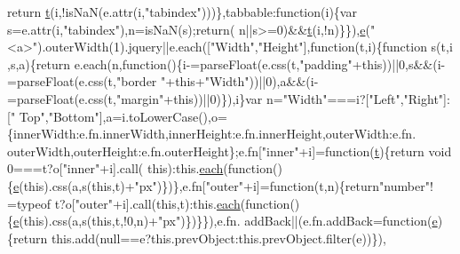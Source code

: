 \begin{DoxyCode}
{      return} \hyperlink{jquery-2_80_83_8min_8js_aaccc9105df5383111407fd5b41255e23}{t}(i,!isNaN(e.attr(i,\textcolor{stringliteral}{"tabindex"})))\},tabbable:\textcolor{keyword}{function}(i)\{var s=e.attr(i,\textcolor{stringliteral}{"tabindex"}),n=isNaN(s);\textcolor{keywordflow}{return}(
      n||s>=0)&&\hyperlink{jquery-2_80_83_8min_8js_aaccc9105df5383111407fd5b41255e23}{t}(i,!n)\}\}),\hyperlink{jquery-ui_8min_8js_a2c038346d47955cbe2cb91e338edd7e1}{e}(\textcolor{stringliteral}{"<a>"}).outerWidth(1).jquery||e.each([\textcolor{stringliteral}{"Width"},\textcolor{stringliteral}{"Height"}],\textcolor{keyword}{function}(t,i)\{\textcolor{keyword}{function} s(t,i
      ,s,a)\{\textcolor{keywordflow}{return} e.each(n,\textcolor{keyword}{function}()\{i-=parseFloat(e.css(t,\textcolor{stringliteral}{"padding"}+\textcolor{keyword}{this}))||0,s&&(i-=parseFloat(e.css(t,\textcolor{stringliteral}{"border
      "}+\textcolor{keyword}{this}+\textcolor{stringliteral}{"Width"}))||0),a&&(i-=parseFloat(e.css(t,\textcolor{stringliteral}{"margin"}+\textcolor{keyword}{this}))||0)\}),i\}var n=\textcolor{stringliteral}{"Width"}===i?[\textcolor{stringliteral}{"Left"},\textcolor{stringliteral}{"Right"}]:[\textcolor{stringliteral}{"
      Top"},\textcolor{stringliteral}{"Bottom"}],a=i.toLowerCase(),o=\{innerWidth:e.fn.innerWidth,innerHeight:e.fn.innerHeight,outerWidth:e.fn.
      outerWidth,outerHeight:e.fn.outerHeight\};e.fn[\textcolor{stringliteral}{"inner"}+i]=\textcolor{keyword}{function}(\hyperlink{jquery-2_80_83_8min_8js_aaccc9105df5383111407fd5b41255e23}{t})\{\textcolor{keywordflow}{return} \textcolor{keywordtype}{void} 0===t?o[\textcolor{stringliteral}{"inner"}+i].call(\textcolor{keyword}{
      this}):this.\hyperlink{jquery-2_80_83_8min_8js_acac159895212e159f5cbd2080cc4d737}{each}(\textcolor{keyword}{function}()\{\hyperlink{jquery-ui_8min_8js_a2c038346d47955cbe2cb91e338edd7e1}{e}(\textcolor{keyword}{this}).css(a,s(\textcolor{keyword}{this},t)+\textcolor{stringliteral}{"px"})\})\},e.fn[\textcolor{stringliteral}{"outer"}+i]=\textcolor{keyword}{function}(t,n)\{\textcolor{keywordflow}{return}\textcolor{stringliteral}{"number"}!
      =typeof t?o[\textcolor{stringliteral}{"outer"}+i].call(\textcolor{keyword}{this},t):this.\hyperlink{jquery-2_80_83_8min_8js_acac159895212e159f5cbd2080cc4d737}{each}(\textcolor{keyword}{function}()\{\hyperlink{jquery-ui_8min_8js_a2c038346d47955cbe2cb91e338edd7e1}{e}(\textcolor{keyword}{this}).css(a,s(\textcolor{keyword}{this},t,!0,n)+\textcolor{stringliteral}{"px"})\})\}\}),e.fn.
      addBack||(e.fn.addBack=\textcolor{keyword}{function}(\hyperlink{jquery-ui_8min_8js_a2c038346d47955cbe2cb91e338edd7e1}{e})\{\textcolor{keywordflow}{return} this.add(null==e?this.prevObject:this.prevObject.filter(e))\}),

\end{DoxyCode}

